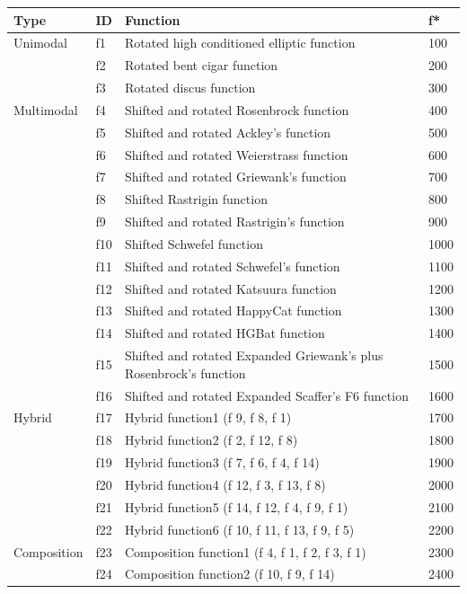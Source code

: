 \begin{table}[]
\begin{tabular}{llll}
  \textbf{Type}
    & \textbf{ID} & \textbf{Function} & \textbf{f*} \\ \hline
  Unimodal
    & f1 & Rotated high conditioned elliptic function & 100 \\
    & f2 & Rotated bent cigar function & 200 \\
    & f3 & Rotated discus function & 300 \\
  Multimodal
    & f4 & Shifted and rotated Rosenbrock function & 400 \\
    & f5 & Shifted and rotated Ackley's function & 500 \\
    & f6 & Shifted and rotated Weierstrass function & 600 \\
    & f7 & Shifted and rotated Griewank's function & 700 \\
    & f8 & Shifted Rastrigin function & 800 \\
    & f9 & Shifted and rotated Rastrigin's function & 900 \\
    & f10 & Shifted Schwefel function & 1000 \\
    & f11 & Shifted and rotated Schwefel's function & 1100 \\
    & f12 & Shifted and rotated Katsuura function & 1200 \\
    & f13 & Shifted and rotated HappyCat function & 1300 \\
    & f14 & Shifted and rotated HGBat function & 1400 \\
    & f15 & Shifted and rotated Expanded Griewank's plus Rosenbrock's function & 1500 \\
    & f16 & Shifted and rotated Expanded Scaffer's F6 function & 1600 \\
  Hybrid
    & f17 & Hybrid function1 (f 9, f 8, f 1) & 1700 \\
    & f18 & Hybrid function2 (f 2, f 12, f 8) & 1800 \\
    & f19 & Hybrid function3 (f 7, f 6, f 4, f 14) & 1900 \\
    & f20 & Hybrid function4 (f 12, f 3, f 13, f 8) & 2000 \\
    & f21 & Hybrid function5 (f 14, f 12, f 4, f 9, f 1) & 2100 \\
    & f22 & Hybrid function6 (f 10, f 11, f 13, f 9, f 5) & 2200 \\
  Composition
    & f23 & Composition function1 (f 4, f 1, f 2, f 3, f 1) & 2300 \\
    & f24 & Composition function2 (f 10, f 9, f 14) & 2400 \\

\end{tabular}
\end{table}
